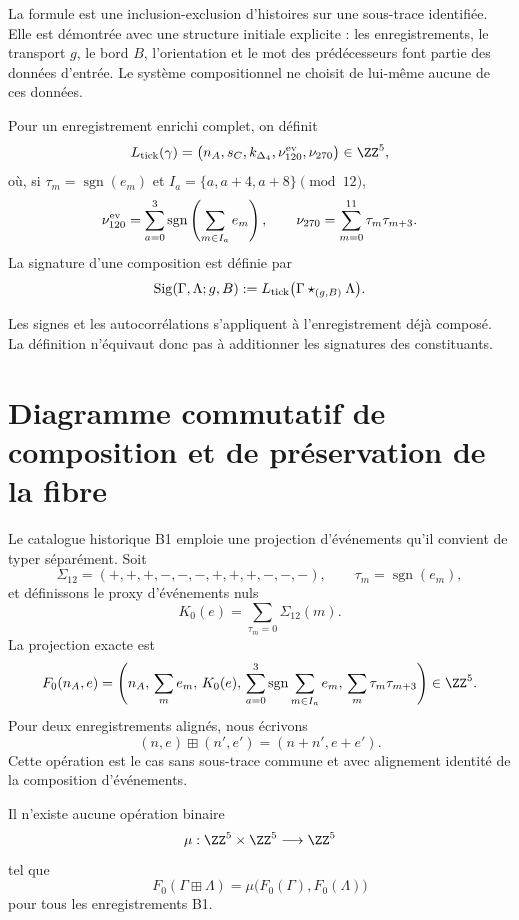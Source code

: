 La formule est une inclusion-exclusion d’histoires sur une sous-trace identifiée. Elle est démontrée avec une structure initiale explicite : les enregistrements, le transport \(g\), le bord \(B\), l’orientation et le mot des prédécesseurs font partie des données d’entrée. Le système compositionnel ne choisit de lui-même aucune de ces données.

\begin{definition}
\label{def:extractor-posterior-empalme-rev6} Pour un enregistrement enrichi complet, on définit
\[
 L_{\rm tick}(\gamma)
 =
 \bigl(
 n_A,s_C,k_{\Delta_4},
 \nu_{120}^{\rm ev},\nu_{270}
 \bigr)\in\ZZ^5,
\]
où, si \(\tau_m=\operatorname{sgn}(e_m)\) et \(I_a=\{a,a+4,a+8\}\pmod {12}\),
\[
 \nu_{120}^{\rm ev}
 =
 \sum_{a=0}^{3}
 \operatorname{sgn}\left(\sum_{m\in I_a}e_m\right),
 \qquad
 \nu_{270}
 =
 \sum_{m=0}^{11}\tau_m\tau_{m+3}.
\]
La signature d’une composition est définie par
\[
 \operatorname{Sig}(\Gamma,\Lambda;g,B)
 :=
 L_{\rm tick}
 \bigl(\Gamma\star_{(g,B)}\Lambda\bigr).
\]
\end{definition}

Les signes et les autocorrélations s’appliquent à l’enregistrement déjà composé. La définition n’équivaut donc pas à additionner les signatures des constituants.

\section{Diagramme commutatif de composition et de préservation de la fibre}
\label{sec:rombo-no-descenso-composicional-rev6}

Le catalogue historique B1 emploie une projection d’événements qu’il convient de typer séparément. Soit
\[
 \Sigma_{12}=(+,+,+,-,-,-,+,+,+,-,-,-),
 \qquad \tau_m=\operatorname{sgn}(e_m),
\]
et définissons le proxy d’événements nuls
\[
 K_0(e)
 =
 \sum_{\tau_m=0}\Sigma_{12}(m).
\]
La projection exacte est
\[
 F_0(n_A,e)
 =
 \left(
 n_A,\,
 \sum_m e_m,\,
 K_0(e),\,
 \sum_{a=0}^{3}
   \operatorname{sgn}\sum_{m\in I_a}e_m,\,
 \sum_m\tau_m\tau_{m+3}
 \right)\in\ZZ^5.
\]
Pour deux enregistrements alignés, nous écrivons
\[
 (n,e)\boxplus(n',e')=(n+n',e+e').
\]
Cette opération est le cas sans sous-trace commune et avec alignement identité de la composition d’événements.

\begin{proposition}
\label{prop:no-descenso-proyeccion-b1-rev6} Il n’existe aucune opération binaire
\[
 \mu:\ZZ^5\times\ZZ^5\longrightarrow\ZZ^5
\]
tel que
\[
 F_0(\Gamma\boxplus\Lambda)
 =
 \mu\bigl(F_0(\Gamma),F_0(\Lambda)\bigr)
\]
pour tous les enregistrements B1.
\end{proposition}

